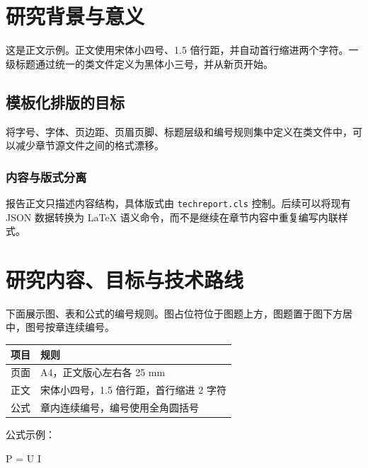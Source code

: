 \documentclass{techreport}
\begin{document}
\makecover
\makeapproval

\reportfrontmatter
\makeabstract
\makereporttoc

\reportmainmatter

\section{研究背景与意义}

这是正文示例。正文使用宋体小四号、1.5 倍行距，并自动首行缩进两个字符。一级标题通过统一的类文件定义为黑体小三号，并从新页开始。

\subsection{模板化排版的目标}

将字号、字体、页边距、页眉页脚、标题层级和编号规则集中定义在类文件中，可以减少章节源文件之间的格式漂移。

\subsubsection{内容与版式分离}

报告正文只描述内容结构，具体版式由 \verb|techreport.cls| 控制。后续可以将现有 JSON 数据转换为 LaTeX 语义命令，而不是继续在章节内容中重复编写内联样式。

\section{研究内容、目标与技术路线}

下面展示图、表和公式的编号规则。图占位符位于图题上方，图题置于图下方居中，图号按章连续编号。


\begin{center}
  \begin{tabular}{@{}p{}p{}@{}}
    \toprule
    项目 & 规则 \\
    \midrule
    页面 & A4，正文版心左右各 25 mm \\
    正文 & 宋体小四号，1.5 倍行距，首行缩进 2 字符 \\
    公式 & 章内连续编号，编号使用全角圆括号 \\
    \bottomrule
  \end{tabular}
\end{center}

公式示例：
\begin{reportequation}
  P = U \times I \times \cos\varphi
\end{reportequation}
\end{document}
